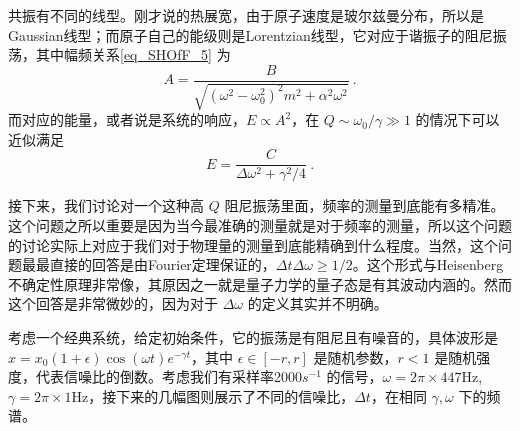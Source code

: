 共振有不同的线型。刚才说的热展宽，由于原子速度是玻尔兹曼分布，所以是Gaussian线型；而原子自己的能级则是Lorentzian线型，它对应于谐振子的阻尼振荡，其中幅频关系\autoref{eq_SHOfF_5} 为
\begin{equation}
A = \frac{B}{\sqrt{(\omega^2 - \omega_0^2)^2 m^2 + \alpha^2\omega^2}}~.
\end{equation}
而对应的能量，或者说是系统的响应，$E\propto A^2$，在 $Q\sim\omega_0/\gamma\gg1$ 的情况下可以近似满足
\begin{equation}
E = \frac{C}{\Delta\omega^2 + \gamma^2/4}~. 
\end{equation}

接下来，我们讨论对一个这种高 $Q$ 阻尼振荡里面，频率的测量到底能有多精准。这个问题之所以重要是因为当今最准确的测量就是对于频率的测量，所以这个问题的讨论实际上对应于我们对于物理量的测量到底能精确到什么程度。当然，这个问题最最直接的回答是由Fourier定理保证的，$\Delta t\Delta \omega\ge1/2$。这个形式与Heisenberg不确定性原理非常像，其原因之一就是量子力学的量子态是有其波动内涵的。然而这个回答是非常微妙的，因为对于 $\Delta\omega$ 的定义其实并不明确。

考虑一个经典系统，给定初始条件，它的振荡是有阻尼且有噪音的，具体波形是 $x=x_0(1+\epsilon)\cos(\omega t)e^{-\gamma t}$，其中 $\epsilon\in[-r,r]$ 是随机参数，$r<1$ 是随机强度，代表信噪比的倒数。考虑我们有采样率2000$s^{-1}$ 的信号，$\omega=2\pi\times447$Hz, $\gamma=2\pi\times1$Hz，接下来的几幅图则展示了不同的信噪比，$\Delta t$，在相同 $\gamma, \omega$ 下的频谱。
